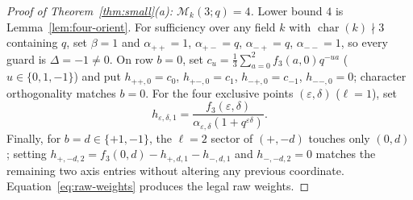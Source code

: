 \documentclass[11pt,reqno]{amsart}
\numberwithin{equation}{section}
\theoremstyle{definition}
\theoremstyle{remark}
\newcommand{\eps}{\varepsilon}
\newcommand{\M}{\mathcal{M}}
\begin{document}
\begin{proof}[Proof of Theorem~\ref{thm:small}(a): $\M_k(3;q)=4$]
Lower bound $4$ is Lemma~\ref{lem:four-orient}. For sufficiency over any field $k$ with $\operatorname{char}(k)\nmid 3$ containing $q$, set $\beta=1$ and $\alpha_{++}=1$, $\alpha_{+-}=q$, $\alpha_{-+}=q$, $\alpha_{--}=1$, so every guard is $\Delta=-1\ne 0$. On row $b=0$, set $c_u = \frac{1}{3}\sum_{a=0}^2 f_3(a,0)q^{-ua}$ ($u\in\{0,1,-1\}$) and put $h_{++,0}=c_0$, $h_{+-,0}=c_1$, $h_{-+,0}=c_{-1}$, $h_{--,0}=0$; character orthogonality matches $b=0$. For the four exclusive points $(\eps,\delta)$ ($\ell=1$), set
\[
h_{\eps,\delta,1} = \frac{f_3(\eps,\delta)}{\alpha_{\eps,\delta}(1+q^{\eps\delta})}.
\]
Finally, for $b=d\in\{+1,-1\}$, the $\ell=2$ sector of $(+,-d)$ touches only $(0,d)$; setting $h_{+,-d,2}=f_3(0,d)-h_{+,d,1}-h_{-,d,1}$ and $h_{-,-d,2}=0$ matches the remaining two axis entries without altering any previous coordinate. Equation~\eqref{eq:raw-weights} produces the legal raw weights.
\end{proof}
\end{document}
